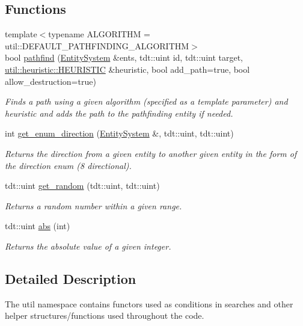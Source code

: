 \subsection*{Functions}
\begin{DoxyCompactItemize}
\item 
{\footnotesize template$<$typename A\+L\+G\+O\+R\+I\+T\+HM  = util\+::\+D\+E\+F\+A\+U\+L\+T\+\_\+\+P\+A\+T\+H\+F\+I\+N\+D\+I\+N\+G\+\_\+\+A\+L\+G\+O\+R\+I\+T\+HM$>$ }\\bool \hyperlink{namespaceutil_a1d8b1dc5bfaf22eb62b03173a6ff9b56}{pathfind} (\hyperlink{class_entity_system}{Entity\+System} \&ents, tdt\+::uint id, tdt\+::uint target, \hyperlink{structutil_1_1heuristic_1_1_h_e_u_r_i_s_t_i_c}{util\+::heuristic\+::\+H\+E\+U\+R\+I\+S\+T\+IC} \&heuristic, bool add\+\_\+path=true, bool allow\+\_\+destruction=true)
\begin{DoxyCompactList}\small\item\em Finds a path using a given algorithm (specified as a template parameter) and heuristic and adds the path to the pathfinding entity if needed. \end{DoxyCompactList}\item 
int \hyperlink{namespaceutil_a4fd81a09fe0765ab442dbacb43c62d1e}{get\+\_\+enum\+\_\+direction} (\hyperlink{class_entity_system}{Entity\+System} \&, tdt\+::uint, tdt\+::uint)
\begin{DoxyCompactList}\small\item\em Returns the direction from a given entity to another given entity in the form of the direction enum (8 directional). \end{DoxyCompactList}\item 
tdt\+::uint \hyperlink{namespaceutil_a9267980c5006215bdbd5a49128cc0c7d}{get\+\_\+random} (tdt\+::uint, tdt\+::uint)
\begin{DoxyCompactList}\small\item\em Returns a random number within a given range. \end{DoxyCompactList}\item 
tdt\+::uint \hyperlink{namespaceutil_a492f7b93477cd704494b8da44df0e09b}{abs} (int)
\begin{DoxyCompactList}\small\item\em Returns the absolute value of a given integer. \end{DoxyCompactList}\end{DoxyCompactItemize}


\subsection{Detailed Description}
The util namespace contains functors used as conditions in searches and other helper structures/functions used throughout the code. 

